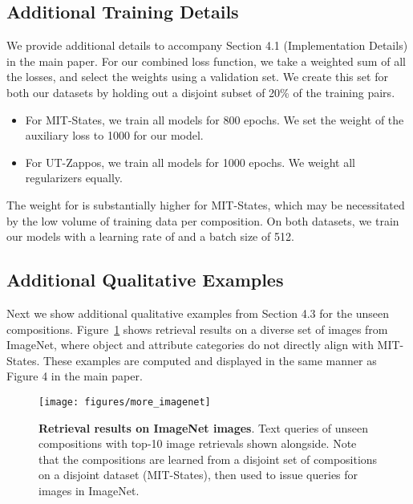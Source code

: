 \documentclass[runningheads]{llncs}
\newcommand{\reffig}[1]{Figure~\ref{#1}}
\begin{document}
\subsection*{Additional Training Details}

We provide additional details to accompany Section 4.1 (Implementation Details) in the main paper. 
For our combined loss function, we take a weighted sum of all the losses, and select the weights using a validation set. We create this set for both our datasets by holding out a disjoint subset of 20\% of the training pairs. 

\begin{itemize}
	\item For MIT-States, we train all models for 800 epochs. We set the weight of the auxiliary loss  to 1000 for our model.
	\item For UT-Zappos, we train all models for 1000 epochs. We weight all regularizers equally. 
\end{itemize}

The weight for  is substantially higher for MIT-States, which may be necessitated by the low volume of training data per composition. On both datasets, we train our models with a learning rate of  and a batch size of 512.

\subsection*{Additional Qualitative Examples}
Next we show additional qualitative examples from Section 4.3 for the unseen compositions.  \reffig{fig:more_imagenet} shows retrieval results on a diverse set of images from ImageNet, where object and attribute categories do not directly align with MIT-States.  These examples are computed and displayed in the same manner as Figure 4 in the main paper.

\begin{figure}[t]
\centering
\texttt{[image: figures/more\_imagenet]}
\caption{\textbf{Retrieval results on ImageNet images}. Text queries of unseen compositions with top-10 image retrievals shown alongside. Note that the compositions are learned from a disjoint set of compositions on a disjoint dataset (MIT-States), then used to issue queries for images in ImageNet.} 
\label{fig:more_imagenet}
\end{figure} 
\end{document}

